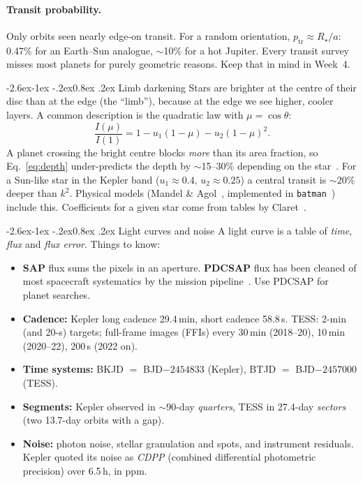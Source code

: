 \documentclass[11pt,a4paper]{article}
\makeatletter
\renewcommand\subsection{\@startsection{subsection}{2}{\z@}%
  {-2.6ex\@plus -1ex \@minus -.2ex}{0.8ex \@plus .2ex}%
  {\normalfont\sffamily\Large\bfseries\color{navy}}}
\newcommand{\pkg}[1]{\texttt{#1}}
\makeatother
\begin{document}
\paragraph{Transit probability.} Only orbits seen nearly edge-on transit. For a random orientation,
\(p_\text{tr} \approx R_\star/a\): 0.47\% for an Earth--Sun analogue, \(\sim\)10\% for a hot Jupiter.
Every transit survey misses most planets for purely geometric reasons. Keep that in mind in Week~4.

\subsection{Limb darkening}
Stars are brighter at the centre of their disc than at the edge (the ``limb''), because at the edge we see higher,
cooler layers. A common description is the quadratic law with \(\mu = \cos\theta\):
\begin{equation}
  \frac{I(\mu)}{I(1)} = 1 - u_1(1-\mu) - u_2(1-\mu)^2 .
\end{equation}
A planet crossing the bright centre blocks \emph{more} than its area fraction, so Eq.~\eqref{eq:depth} under-predicts the depth
by \(\sim\)15--30\% depending on the star~\citep{Heller2019}. For a Sun-like star in the Kepler band
(\(u_1\approx0.4,\,u_2\approx0.25\)) a central transit is \(\sim\)20\% deeper than \(k^2\). Physical models
(Mandel \& Agol~\citep{MandelAgol2002}, implemented in \pkg{batman}~\citep{Kreidberg2015}) include this. Coefficients for a
given star come from tables by Claret~\citep{Claret2011,Claret2017}.

\subsection{Light curves and noise}
\label{sec:noise}
A light curve is a table of \emph{time}, \emph{flux} and \emph{flux error}. Things to know:
\begin{itemize}
  \item \textbf{SAP} flux sums the pixels in an aperture. \textbf{PDCSAP} flux has been cleaned of most spacecraft
        systematics by the mission pipeline~\citep{Jenkins2010}. Use PDCSAP for planet searches.
  \item \textbf{Cadence:} Kepler long cadence 29.4\,min, short cadence 58.8\,s. TESS: 2-min (and 20-s) targets; full-frame images
        (FFIs) every 30\,min (2018--20), 10\,min (2020--22), 200\,s (2022 on).
  \item \textbf{Time systems:} BKJD \(=\) BJD\(-2454833\) (Kepler), BTJD \(=\) BJD\(-2457000\) (TESS).
  \item \textbf{Segments:} Kepler observed in \(\sim\)90-day \emph{quarters}, TESS in 27.4-day \emph{sectors} (two 13.7-day orbits with a gap).
  \item \textbf{Noise:} photon noise, stellar granulation and spots, and instrument residuals. Kepler quoted its noise as
        \emph{CDPP} (combined differential photometric precision) over 6.5\,h, in ppm.
\end{itemize}
\end{document}

